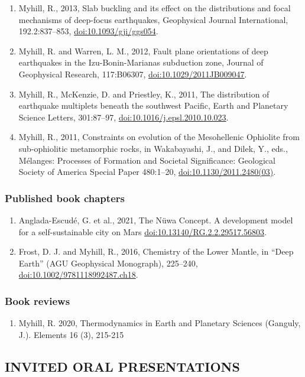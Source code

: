 \documentclass[11pt,twoside,a4paper]{article}
\newcommand{\doi}[1]{\href{http://dx.doi.org/#1}{doi:#1}}
\begin{document}
\begin{enumerate}
\item Myhill, R., 2013, Slab buckling and its effect on the distributions and focal mechanisms of deep-focus earthquakes, Geophysical Journal International, 192.2:837--853, \doi{10.1093/gji/ggs054}.
\item Myhill, R. and Warren, L. M., 2012, Fault plane orientations of deep earthquakes in the Izu-Bonin-Marianas subduction zone, Journal of Geophysical Research, 117:B06307, \doi{10.1029/2011JB009047}.
\item Myhill, R., McKenzie, D. and Priestley, K., 2011, The distribution of earthquake multiplets beneath the southwest Pacific, Earth and Planetary Science Letters, 301:87--97, \doi{10.1016/j.epsl.2010.10.023}.
\item Myhill, R., 2011, Constraints on evolution of the Mesohellenic Ophiolite from sub-ophiolitic metamorphic rocks, in Wakabayashi, J., and Dilek, Y., eds., M\'elanges: Processes of Formation and Societal Significance: Geological Society of America Special Paper 480:1--20, \doi{10.1130/2011.2480(03)}.
\end{enumerate}

\subsubsection*{Published book chapters}
\begin{enumerate}
 \item Anglada-Escud\'{e}, G. et al., 2021, The N\"{u}wa Concept. A development model for a self-sustainable city on Mars \doi{10.13140/RG.2.2.29517.56803}.
 \item Frost, D. J. and Myhill, R., 2016, Chemistry of the Lower Mantle, in ``Deep Earth'' (AGU Geophysical Monograph), 225--240, \doi{10.1002/9781118992487.ch18}.
\end{enumerate}

\subsubsection*{Book reviews}
\begin{enumerate}
\item Myhill, R. 2020, Thermodynamics in Earth and Planetary Sciences (Ganguly, J.). Elements 16 (3), 215-215
\end{enumerate}

\clearpage
\subsection*{INVITED ORAL PRESENTATIONS}
\end{document}

